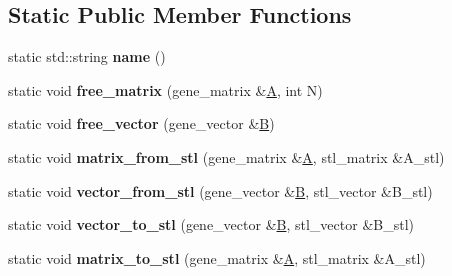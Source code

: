 \subsection*{Static Public Member Functions}
\begin{DoxyCompactItemize}
\item 
\mbox{\label{classblitz__interface_a8b0112aaef84c3fcd8c54666b12744b4}} 
static std\+::string {\bfseries name} ()
\item 
\mbox{\label{classblitz__interface_a6acfa1927d115d1dee3321d7d20750f6}} 
static void {\bfseries free\+\_\+matrix} (gene\+\_\+matrix \&\hyperlink{group___core___module_class_eigen_1_1_matrix}{A}, int N)
\item 
\mbox{\label{classblitz__interface_a3e1d5fbd89956497407996500c08b997}} 
static void {\bfseries free\+\_\+vector} (gene\+\_\+vector \&\hyperlink{group___core___module_class_eigen_1_1_matrix}{B})
\item 
\mbox{\label{classblitz__interface_a1b7993acbb17ef8e3735f3eb0df1ef9a}} 
static void {\bfseries matrix\+\_\+from\+\_\+stl} (gene\+\_\+matrix \&\hyperlink{group___core___module_class_eigen_1_1_matrix}{A}, stl\+\_\+matrix \&A\+\_\+stl)
\item 
\mbox{\label{classblitz__interface_a45daaf20a09348ae29eb82f09e39da0b}} 
static void {\bfseries vector\+\_\+from\+\_\+stl} (gene\+\_\+vector \&\hyperlink{group___core___module_class_eigen_1_1_matrix}{B}, stl\+\_\+vector \&B\+\_\+stl)
\item 
\mbox{\label{classblitz__interface_a81033396864ea2ff2832a872adbaff77}} 
static void {\bfseries vector\+\_\+to\+\_\+stl} (gene\+\_\+vector \&\hyperlink{group___core___module_class_eigen_1_1_matrix}{B}, stl\+\_\+vector \&B\+\_\+stl)
\item 
\mbox{\label{classblitz__interface_a7aac6f5a1a33cfede0a6fa024cd1c2b1}} 
static void {\bfseries matrix\+\_\+to\+\_\+stl} (gene\+\_\+matrix \&\hyperlink{group___core___module_class_eigen_1_1_matrix}{A}, stl\+\_\+matrix \&A\+\_\+stl)
\item 
\mbox{\label{classblitz__interface_ab49ec7669bb97387a962bee716cd0d8a}} 

\end{DoxyCompactItemize}
